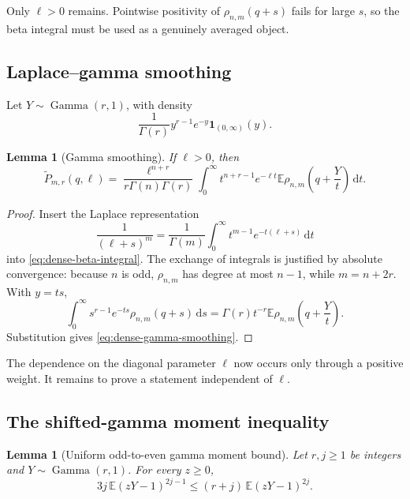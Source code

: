 \documentclass[11pt]{article}
\newtheorem{lemma}[theorem]{Lemma}
\newcommand{\dd}{\,\mathrm d}
\newcommand{\E}{\mathbb E}
\newcommand{\GammaLaw}{\operatorname{Gamma}}
\begin{document}
Only \(\ell>0\) remains.  Pointwise positivity of \(\rho_{n,m}(q+s)\) fails
for large \(s\), so the beta integral must be used as a genuinely averaged
object.

\subsection{Laplace--gamma smoothing}

Let \(Y\sim\GammaLaw(r,1)\), with density
\[
       \frac1{\Gamma(r)}y^{r-1}e^{-y}\mathbf1_{(0,\infty)}(y).
\]

\begin{lemma}[Gamma smoothing]\label{lem:dense-gamma-smoothing}
If \(\ell>0\), then
\begin{equation}\label{eq:dense-gamma-smoothing}
 \widetilde P_{m,r}(q,\ell)
 =\frac{\ell^{n+r}}{r\Gamma(n)\Gamma(r)}
  \int_0^\infty
       t^{n+r-1}e^{-\ell t}
       \E\rho_{n,m}\left(q+\frac Yt\right)\dd t.
\end{equation}
\end{lemma}

\begin{proof}
Insert the Laplace representation
\[
       \frac1{(\ell+s)^m}
       =\frac1{\Gamma(m)}\int_0^\infty
          t^{m-1}e^{-t(\ell+s)}\dd t
\]
into \eqref{eq:dense-beta-integral}.  The exchange of integrals is justified
by absolute convergence: because \(n\) is odd, \(\rho_{n,m}\) has degree at
most \(n-1\), while \(m=n+2r\).  With \(y=ts\),
\[
 \int_0^\infty s^{r-1}e^{-ts}\rho_{n,m}(q+s)\dd s
 =\Gamma(r)t^{-r}
  \E\rho_{n,m}\left(q+\frac Yt\right).
\]
Substitution gives \eqref{eq:dense-gamma-smoothing}.
\end{proof}

The dependence on the diagonal parameter \(\ell\) now occurs only through a
positive weight.  It remains to prove a statement independent of \(\ell\).

\subsection{The shifted-gamma moment inequality}

\begin{lemma}[Uniform odd-to-even gamma moment bound]\label{lem:gamma-moment}
Let \(r,j\ge1\) be integers and \(Y\sim\GammaLaw(r,1)\).  For every
\(z\ge0\),
\begin{equation}\label{eq:gamma-moment}
       3j\,\E(zY-1)^{2j-1}
       \le(r+j)\,\E(zY-1)^{2j}.
\end{equation}
\end{lemma}
\end{document}
